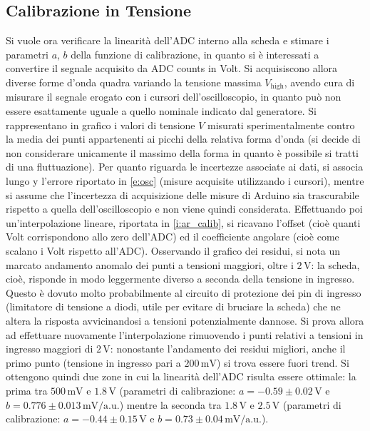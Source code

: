 \documentclass[a4paper,11pt]{article} %
\begin{document}
\subsection{Calibrazione in Tensione}
Si vuole ora verificare la linearità dell'ADC interno alla scheda e stimare i parametri $a$, $b$ della funzione di
calibrazione, in quanto si è interessati a convertire il segnale acquisito da ADC counts in Volt. Si acquisiscono allora
diverse forme d'onda quadra variando la tensione massima $V_{\text{high}}$, avendo cura di misurare il segnale erogato
con i cursori dell'oscilloscopio, in quanto può non essere esattamente uguale a quello nominale indicato dal generatore.
Si rappresentano in grafico i valori di tensione $V$ misurati sperimentalmente contro la media dei punti appartenenti ai
picchi della relativa forma d'onda (si decide di non considerare unicamente il massimo della forma in quanto è possibile
si tratti di una fluttuazione). Per quanto riguarda le incertezze associate ai dati, si associa lungo y l'errore
riportato in \autoref{e:osc} (misure acquisite utilizzando i cursori), mentre si assume che l'incertezza di acquisizione
delle misure di Arduino sia trascurabile rispetto a quella dell'oscilloscopio e non viene quindi considerata.
Effettuando poi un'interpolazione lineare, riportata in \autoref{i:ar_calib}, si ricavano l'offset (cioè quanti Volt
corrispondono allo zero dell'ADC) ed il coefficiente angolare (cioè come scalano i Volt rispetto all'ADC). Osservando il
grafico dei residui, si nota un marcato andamento anomalo dei punti a tensioni maggiori, oltre i $2\,\si{\volt}$: la
scheda, cioè, risponde in modo leggermente diverso a seconda della tensione in ingresso. Questo è dovuto molto
probabilmente al circuito di protezione dei pin di ingresso (limitatore di tensione a diodi, utile per evitare di
bruciare la scheda) che ne altera la risposta avvicinandosi a tensioni potenzialmente dannose. Si prova allora ad
effettuare nuovamente l'interpolazione rimuovendo i punti relativi a tensioni in ingresso maggiori di $2\,\si{\volt}$:
nonostante l'andamento dei residui migliori, anche il primo punto (tensione in ingresso pari a $200\,\si{\mV}$) si trova
essere fuori trend. Si ottengono quindi due zone in cui la linearità dell'ADC risulta essere ottimale: la prima tra
$500\,\si{\mV}$ e $1.8\,\si{\volt}$ (parametri di calibrazione: $a = -0.59 \pm 0.02 \, \si{\V}$ e $b = 0.776 \pm 0.013
\,\si{\mV}/\text{a.u.}$) mentre la seconda tra $1.8\,\si{\volt}$ e $2.5\,\si{\volt}$ (parametri di calibrazione: $a =
-0.44 \pm 0.15 \, \si{\V}$ e $b = 0.73 \pm 0.04 \,\si{\mV}/\text{a.u.}$). %
\end{document}
